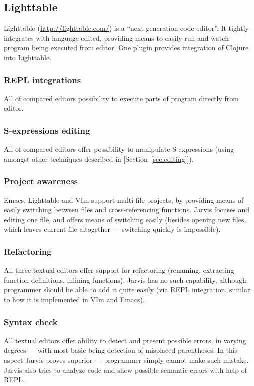 \documentclass[11pt]{scrartcl}
\begin{document}
\subsection{Lighttable}
Lighttable (\url{http://lighttable.com/}) is a ``next generation code editor''.
It tightly integrates with language edited, providing means to easily run and
watch program being executed from editor. One plugin provides integration of
Clojure into Lighttable.

\subsubsection*{REPL integrations}
All of compared editors possibility to execute parts of program directly from editor.

\subsubsection*{S-expressions editing}
All of compared editors offer possibility to manipulate S-expressions (using
amongst other techniques described in [Section~\ref{sec:editing}]).
    
\subsubsection*{Project awareness}
Emacs, Lighttable and VIm support multi-file projects, by providing means of
easily switching between files and cross-referencing functions. Jarvis focuses
and editing one file, and offers means of switching easily (besides opening new
files, which leaves current file altogether --- switching quickly is impossible).
    
\subsubsection*{Refactoring}
All three textual editors offer support for refactoring (renaming, extracting function
definitions, inlining functions). Jarvis has no such capability, although
programmer should be able to add it quite easily (via REPL integration, similar
to how it is implemented in VIm and Emacs).

    
\subsubsection*{Syntax check}
All textual editors offer ability to detect and present possible errors, in
varying degrees --- with most basic being detection of misplaced parentheses.
In this aspect Jarvis proves superior --- programmer simply cannot make such
mistake. Jarvis also tries to analyze code and show possible semantic errors
with help of REPL.\@
    
\end{document}
